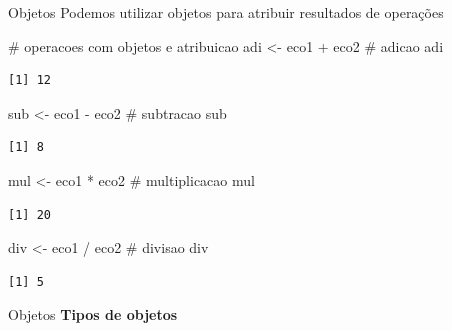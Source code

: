 \documentclass[
  ignorenonframetext,
]{beamer}
\newenvironment{Shaded}{\begin{snugshade}}{\end{snugshade}}
\newcommand{\CommentTok}[1]{\textcolor[rgb]{0.37,0.37,0.37}{#1}}
\newcommand{\NormalTok}[1]{\textcolor[rgb]{0.00,0.23,0.31}{#1}}
\newcommand{\OtherTok}[1]{\textcolor[rgb]{0.00,0.23,0.31}{#1}}
\newcommand{\SpecialCharTok}[1]{\textcolor[rgb]{0.37,0.37,0.37}{#1}}
\begin{document}
\begin{frame}[fragile]{}
\begin{block}{Objetos}
\protect\hypertarget{objetos-7}{}
Podemos utilizar objetos para atribuir resultados de operações

\begin{Shaded}
\begin{Highlighting}[]
\CommentTok{\# operacoes com objetos e atribuicao}
\NormalTok{adi }\OtherTok{\textless{}{-}}\NormalTok{ eco1 }\SpecialCharTok{+}\NormalTok{ eco2 }\CommentTok{\# adicao}
\NormalTok{adi}
\end{Highlighting}
\end{Shaded}

\begin{verbatim}
[1] 12
\end{verbatim}

\begin{Shaded}
\begin{Highlighting}[]
\NormalTok{sub }\OtherTok{\textless{}{-}}\NormalTok{ eco1 }\SpecialCharTok{{-}}\NormalTok{ eco2 }\CommentTok{\# subtracao}
\NormalTok{sub}
\end{Highlighting}
\end{Shaded}

\begin{verbatim}
[1] 8
\end{verbatim}

\begin{Shaded}
\begin{Highlighting}[]
\NormalTok{mul }\OtherTok{\textless{}{-}}\NormalTok{ eco1 }\SpecialCharTok{*}\NormalTok{ eco2 }\CommentTok{\# multiplicacao}
\NormalTok{mul}
\end{Highlighting}
\end{Shaded}

\begin{verbatim}
[1] 20
\end{verbatim}

\begin{Shaded}
\begin{Highlighting}[]
\NormalTok{div }\OtherTok{\textless{}{-}}\NormalTok{ eco1 }\SpecialCharTok{/}\NormalTok{ eco2 }\CommentTok{\# divisao}
\NormalTok{div}
\end{Highlighting}
\end{Shaded}

\begin{verbatim}
[1] 5
\end{verbatim}
\end{block}

\begin{block}{Objetos}
\protect\hypertarget{objetos-8}{}
\textbf{Tipos de objetos}
\end{block}


\end{frame}
\end{document}
